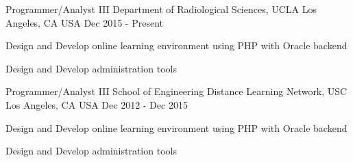 


\begin{cventries}

 
  \cventry
    {Programmer/Analyst III} %
    {Department of Radiological Sciences, UCLA} %
    {Los Angeles, CA USA} %
    {Dec 2015 - Present} %
    {
      \begin{cvitems} %
        \item {Design and Develop online learning environment using PHP with Oracle backend}
        \item {Design and Develop administration tools }       
      \end{cvitems}
    }
	
  \cventry
    {Programmer/Analyst III} %
    {School of Engineering Distance Learning Network, USC} %
    {Los Angeles, CA USA} %
    {Dec 2012 - Dec 2015} %
    {
      \begin{cvitems} %
        \item {Design and Develop online learning environment using PHP with Oracle backend}
        \item {Design and Develop administration tools }       
      \end{cvitems}
    }


\end{cventries}
